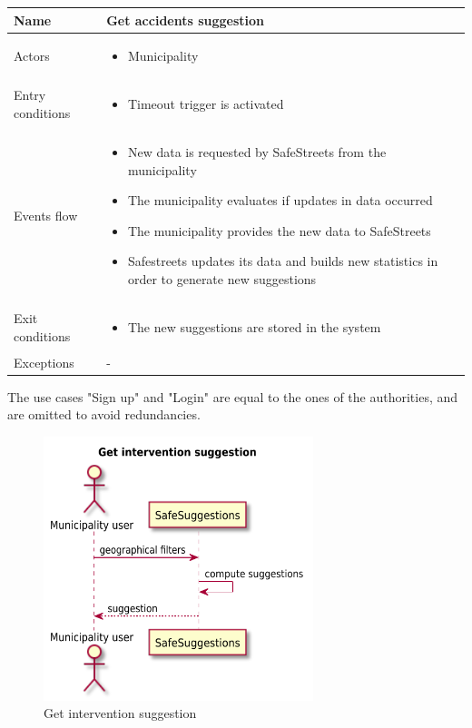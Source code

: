 \documentclass[a4paper]{article}
\begin{document}
\begin{table}[H]
\centering
\begin{tabularx}{\textwidth}{|l|X|}
\hline
Name & Get accidents suggestion\tabularnewline
\hline
Actors &
\begin{itemize}[nosep,leftmargin=*]
\item Municipality
\end{itemize}
\tabularnewline
\hline
Entry conditions &
\begin{itemize}[nosep,leftmargin=*]
\item Timeout trigger is activated
\end{itemize}
\tabularnewline
\hline
Events flow &
\begin{itemize}[nosep,leftmargin=*]
\item New data is requested by SafeStreets from the municipality
\item The municipality evaluates if updates in data occurred
\item The municipality provides the new data to SafeStreets
\item Safestreets updates its data and builds new statistics in order to
generate new suggestions
\end{itemize}
\tabularnewline
\hline
Exit conditions &
\begin{itemize}[nosep,leftmargin=*]
\item The new suggestions are stored in the system
\end{itemize}
\tabularnewline
\hline
Exceptions & -\tabularnewline
\hline
\end{tabularx}
\end{table}

The use cases "Sign up" and "Login" are equal to the ones of the
authorities, and are omitted to avoid redundancies.

\begin{figure}[H]
\centering
\includegraphics[width=0.7\textwidth]{get_intervention_suggestion_sequence_diagram}
\caption{Get intervention suggestion}
\end{figure}
\end{document}
